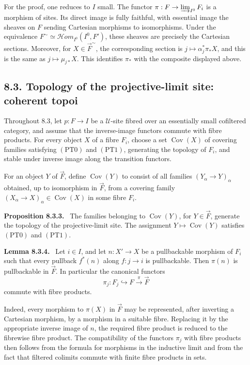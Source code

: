 \documentclass[11pt]{article}
\newcommand{\U}{\mathcal{U}}
\newenvironment{statement}[1]{\par\medskip\noindent\textbf{#1.}\ }{\par\medskip}
\begin{document}
For the proof, one reduces to \(I\) small. The functor \(\pi:F\to\varinjlim_{I^0}F_i\) is a morphism of sites. Its direct image is fully faithful, with essential image the sheaves on \(F\) sending Cartesian morphisms to isomorphisms. Under the equivalence \(F^\sim\simeq\mathcal{H}om_{I^0}(I^0,F')\), these sheaves are precisely the Cartesian sections. Moreover, for \(X\in\overrightarrow F^\sim\), the corresponding section is \(j\mapsto\alpha_j^*\pi_*X\), and this is the same as \(j\mapsto\mu_{j*}X\). This identifies \(\pi_*\) with the composite displayed above.

\subsection*{8.3. Topology of the projective-limit site: coherent topoi}

Throughout 8.3, let \(p:F\to I\) be a \(\U\)-site fibred over an essentially small cofiltered category, and assume that the inverse-image functors commute with fibre products. For every object \(X\) of a fibre \(F_i\), choose a set \(\operatorname{Cov}(X)\) of covering families satisfying \((\mathrm{PT0})\) and \((\mathrm{PT1})\), generating the topology of \(F_i\), and stable under inverse image along the transition functors.

For an object \(Y\) of \(\overrightarrow F\), define \(\operatorname{Cov}(Y)\) to consist of all families \((Y_\alpha\to Y)_\alpha\) obtained, up to isomorphism in \(\overrightarrow F\), from a covering family \((X_\alpha\to X)_\alpha\in\operatorname{Cov}(X)\) in some fibre \(F_i\).

\begin{statement}{Proposition 8.3.3}
The families belonging to \(\operatorname{Cov}(Y)\), for \(Y\in\overrightarrow F\), generate the topology of the projective-limit site. The assignment \(Y\mapsto\operatorname{Cov}(Y)\) satisfies \((\mathrm{PT0})\) and \((\mathrm{PT1})\).
\end{statement}

\begin{statement}{Lemma 8.3.4}
Let \(i\in I\), and let \(n:X'\to X\) be a pullbackable morphism of \(F_i\) such that every pullback \(f^*(n)\) along \(f:j\to i\) is pullbackable. Then \(\pi(n)\) is pullbackable in \(\overrightarrow F\). In particular the canonical functors
\[
 \pi_j:F_j\hookrightarrow F\xrightarrow{\pi}\overrightarrow F
\]
commute with fibre products.
\end{statement}
Indeed, every morphism to \(\pi(X)\) in \(\overrightarrow F\) may be represented, after inverting a Cartesian morphism, by a morphism in a suitable fibre. Replacing it by the appropriate inverse image of \(n\), the required fibre product is reduced to the fibrewise fibre product. The compatibility of the functors \(\pi_j\) with fibre products then follows from the formula for morphisms in the inductive limit and from the fact that filtered colimits commute with finite fibre products in sets.
\end{document}
